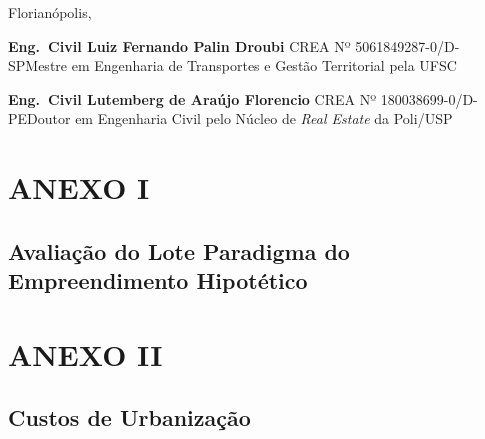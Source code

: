 \documentclass[
  10pt,
  a4paper]{article}
\begin{document}
Florianópolis, \thedate

\vspace*{5\baselineskip}

\singlespacing

\noindent
\textbf{Eng.\textordmasculine\ Civil Luiz Fernando Palin Droubi}\newline
CREA Nº 5061849287-0/D-SP\newline Mestre em Engenharia de Transportes e
Gestão Territorial pela UFSC

\vspace*{5\baselineskip}

\noindent
\textbf{Eng.\textordmasculine\ Civil Lutemberg de Araújo Florencio}\newline
CREA Nº 180038699-0/D-PE\newline Doutor em Engenharia Civil pelo Núcleo
de \emph{Real Estate} da Poli/USP

\newpage

\section*{ANEXO I}\label{anexo-i}

\subsection*{Avaliação do Lote Paradigma do Empreendimento
Hipotético}\label{avaliauxe7uxe3o-do-lote-paradigma-do-empreendimento-hipotuxe9tico}



\newpage

\section*{ANEXO II}\label{anexo-ii}

\subsection*{Custos de Urbanização}\label{custos-de-urbanizauxe7uxe3o}
\end{document}
